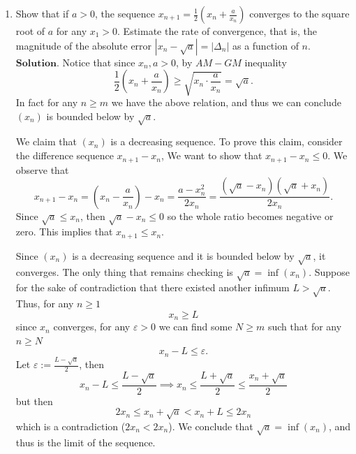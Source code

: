 \documentclass{article}
\theoremstyle{remark}
\begin{document}
\begin{enumerate}
\begin{enumerate}
            \item[(b)] Find the limits of the sequences  
            \[
            \{ S_n(a, b) \}, \quad \{ S_{-n}(a, b) \}.
            \]
        \end{enumerate}

        \item Show that if \( a > 0 \), 
        the sequence \( x_{n+1} = \frac{1}{2} \left( x_n + \frac{a}{x_n} \right) \) converges to the square root of \( a \) for any \( x_1 > 0 \).
        Estimate the rate of convergence, that is, the magnitude of the absolute error \( |x_n - \sqrt{a}| = |\Delta_n| \) as a function of \( n \).
        $\textbf{Solution.}$
        Notice that since $x_n, a >0$, by $AM-GM$ inequality
        \[
        \frac{1}{2}\left(x_n + \frac{a}{x_n}\right) \geq \sqrt{x_n\cdot \frac{a}{x_n}} = \sqrt{a}.
        \]
        In fact for any $n \geq m$ we have the above relation, and thus we can conclude 
        $(x_n)$ is bounded below by $\sqrt{a}$.

        We claim that $(x_n)$ is a decreasing sequence. 
        To prove this claim, consider the difference sequence $x_{n+1}-{x_{n}}$, 
        We want to show that $x_{n+1} - x_{n} \leq 0$. We observe that 
        \[
        x_{n+1} - x_{n} = \left(x_n - \frac{a}{x_n}\right) - x_n = \frac{a-x_{n}^2}{2x_{n}} = \frac{(\sqrt{a}-x_{n})(\sqrt{a}+x_{n})}{2x_{n}}.
        \]
        Since $\sqrt{a} \leq x_n$, then $\sqrt{a}-x_n \leq 0$ so the whole ratio becomes negative or zero. This implies that $x_{n+1} \leq x_n$.

        Since $(x_n)$ is a decreasing sequence and it is bounded below by $\sqrt{a}$, it converges.
        The only thing that remains checking is $\sqrt{a} = \inf(x_n)$.
        Suppose for the sake of contradiction that there existed another infimum $L > \sqrt{a}$.
        Thus, for any $n \geq 1$
        \[
        x_n \geq L
        \]
        since $x_n$ converges, for any $\varepsilon>0$ we can find some $N \geq m$ such that for any $n \geq N$
        \[
        x_n -L \leq \varepsilon.
        \]
        Let $\varepsilon := \frac{L-\sqrt{a}}{2}$, then 
        \[
        x_n - L \leq \frac{L-\sqrt{a}}{2} \implies x_n \leq \frac{L+\sqrt{a}}{2} \leq \frac{x_n+\sqrt{a}}{2}
        \]
        but then 
        \[
        2x_n \leq x_n + \sqrt{a} < x_n + L \leq 2x_n
        \]
        which is a contradiction ($2x_n < 2x_n$).
        We conclude that $\sqrt{a} = \inf(x_n)$, and thus is the limit of the sequence.


\end{enumerate}
\end{document}
